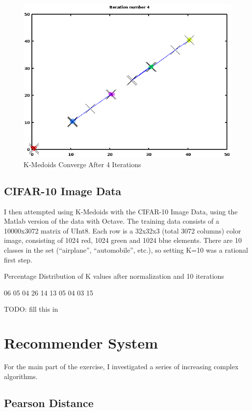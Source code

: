 \documentclass[11pt, oneside]{article}   	%
\begin{document}
\begin{figure}[h!]
\centering
\includegraphics[scale=0.6]{K-Medoid}
\caption{K-Medoids Converge After 4 Iterations}
\end{figure}

\subsection*{CIFAR-10 Image Data}

I then attempted using K-Medoids with the CIFAR-10 Image Data, using the Matlab version of the data with Octave. The training data consists of a 10000x3072 matrix of UInt8. Each row is a 32x32x3 (total 3072 columns) color image, consisting of 1024 red, 1024 green and 1024 blue elements. There are 10 classes in the set (``airplane'', ``automobile'', etc.), so setting K=10 was a rational first step.

Percentage Distribution of K values after normalization and 10 iterations

06
05
04
26
14
13
05
04
03
15

TODO: fill this in
\clearpage

\section*{Recommender System}

For the main part of the exercise, I investigated a series of increasing complex algorithms. 

\subsection*{Pearson Distance}
\end{document}
